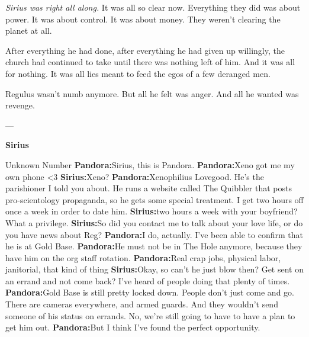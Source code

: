 \documentclass[12pt,twoside,openright]{memoir}
\begin{document}
\textit{Sirius was right all along.} It was all so clear now. Everything they did was about power. It was about control. It was about money. They weren't clearing the planet at all. 

After everything he had done, after everything he had given up willingly, the church had continued to take until there was nothing left of him. And it was all for nothing. It was all lies meant to feed the egos of a few deranged men. 

Regulus wasn't numb anymore. But all he felt was anger. And all he wanted was revenge.

---

\textbf{Sirius} 

Unknown Number\newline
\textbf{Pandora:}Sirius, this is Pandora.\newline
\textbf{Pandora:}Xeno got me my own phone {\textless}3\newline
\textbf{Sirius:}Xeno?\newline
\textbf{Pandora:}Xenophilius Lovegood. He's the parishioner I told you about. He runs a website called The Quibbler that posts pro-scientology propaganda, so he gets some special treatment. I get two hours off once a week in order to date him.\newline
\textbf{Sirius:}two hours a week with your boyfriend? What a privilege.\newline
\textbf{Sirius:}So did you contact me to talk about your love life, or do you have news about Reg?\newline
\textbf{Pandora:}I do, actually. I've been able to confirm that he is at Gold Base.\newline
\textbf{Pandora:}He must not be in The Hole anymore, because they have him on the org staff rotation.\newline
\textbf{Pandora:}Real crap jobs, physical labor, janitorial, that kind of thing\newline
\textbf{Sirius:}Okay, so can't he just blow then? Get sent on an errand and not come back? I've heard of people doing that plenty of times.\newline
\textbf{Pandora:}Gold Base is still pretty locked down. People don't just come and go. There are cameras everywhere, and armed guards. And they wouldn't send someone of his status on errands. No, we're still going to have to have a plan to get him out.\newline
\textbf{Pandora:}But I think I've found the perfect opportunity.\newline
\end{document}
